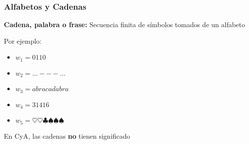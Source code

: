 \begin{frame}
  \frametitle{Alfabetos y Cadenas}
     \begin{defi}
\textbf{Cadena, palabra o frase:}
Secuencia finita de símbolos tomados de un alfabeto
\end{defi}

\pause 
\begin{block}{Por ejemplo:}
\begin{itemize}[<+->]
\item $w_1 = 0110$
\item $w_2 = ...---...$
\item $w_3 = abracadabra$ 
\item $w_4 = 31416$ 
\item $w_5 = \heartsuit \heartsuit \clubsuit \spadesuit \spadesuit \spadesuit$
\end{itemize}
\end{block}

\pause
\begin{block}{En CyA, las cadenas \textbf{no} tienen significado}
\end{block}

\end{frame}
